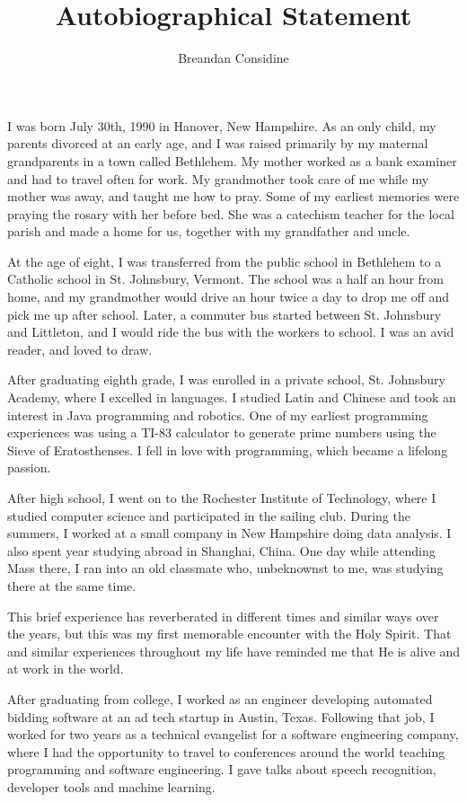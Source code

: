 \documentclass[11pt]{article}
\title{Autobiographical Statement}
\author{Breandan Considine}
\begin{document}
\maketitle
I was born July 30th, 1990 in Hanover, New Hampshire. As an only child, my parents divorced at an early age, and I was raised primarily by my maternal grandparents in a town called Bethlehem. My mother worked as a bank examiner and had to travel often for work. My grandmother took care of me while my mother was away, and taught me how to pray. Some of my earliest memories were praying the rosary with her before bed. She was a catechism teacher for the local parish and made a home for us, together with my grandfather and uncle.

At the age of eight, I was transferred from the public school in Bethlehem to a Catholic school in St. Johnsbury, Vermont. The school was a half an hour from home, and my grandmother would drive an hour twice a day to drop me off and pick me up after school. Later, a commuter bus started between St. Johnsbury and Littleton, and I would ride the bus with the workers to school. I was an avid reader, and loved to draw.

After graduating eighth grade, I was enrolled in a private school, St. Johnsbury Academy, where I excelled in languages. I studied Latin and Chinese and took an interest in Java programming and robotics. One of my earliest programming experiences was using a TI-83 calculator to generate prime numbers using the Sieve of Eratosthenses. I fell in love with programming, which became a lifelong passion.

After high school, I went on to the Rochester Institute of Technology, where I studied computer science and participated in the sailing club. During the summers, I worked at a small company in New Hampshire doing data analysis. I also spent year studying abroad in Shanghai, China. One day while attending Mass there, I ran into an old classmate who, unbeknownst to me, was studying there at the same time.

This brief experience has reverberated in different times and similar ways over the years, but this was my first memorable encounter with the Holy Spirit. That and similar experiences throughout my life have reminded me that He is alive and at work in the world.

After graduating from college, I worked as an engineer developing automated bidding software at an ad tech startup in Austin, Texas. Following that job, I worked for two years as a technical evangelist for a software engineering company, where I had the opportunity to travel to conferences around the world teaching programming and software engineering. I gave talks about speech recognition, developer tools and machine learning.
\end{document}

